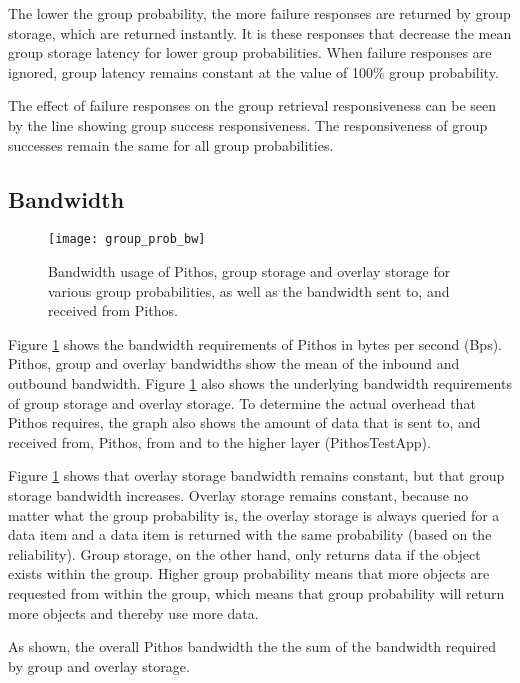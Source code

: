 The lower the group probability, the more failure responses are returned by group storage, which are returned instantly. It is these responses that decrease the mean group storage latency for lower group probabilities. When failure responses are ignored, group latency remains constant at the value of 100\% group probability.

The effect of failure responses on the group retrieval responsiveness can be seen by the line showing group success responsiveness. The responsiveness of group successes remain the same for all group probabilities.

\subsection{Bandwidth}
\label{group_probability_bandwidth}

\begin{figure}[htbp]
 \centering
 \texttt{[image: group\_prob\_bw]}
 \caption{Bandwidth usage of Pithos, group storage and overlay storage for various group probabilities, as well as the bandwidth sent to, and received from Pithos.}
 \label{fig_group_prob_bw}
\end{figure}
%
Figure \ref{fig_group_prob_bw} shows the bandwidth requirements of Pithos in bytes per second (Bps). Pithos, group and overlay bandwidths show the mean of the inbound and outbound bandwidth. Figure \ref{fig_group_prob_bw} also shows the underlying bandwidth requirements of group storage and overlay storage. To determine the actual overhead that Pithos requires, the graph also shows the amount of data that is sent to, and received from, Pithos, from and to the higher layer (PithosTestApp).

Figure \ref{fig_group_prob_bw} shows that overlay storage bandwidth remains constant, but that group storage bandwidth increases. Overlay storage remains constant, because no matter what the group probability is, the overlay storage is always queried for a data item and a data item is returned with the same probability (based on the reliability). Group storage, on the other hand, only returns data if the object exists within the group. Higher group probability means that more objects are requested from within the group, which means that group probability will return more objects and thereby use more data.

As shown, the overall Pithos bandwidth the the sum of the bandwidth required by group and overlay storage.

